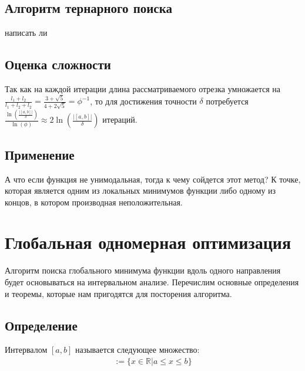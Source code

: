 \documentclass{article}
\begin{document}
    \subsection{Алгоритм тернарного поиска}
    написать ли

    \subsection{Оценка сложности}
    Так как на каждой итерации длина рассматриваемого отрезка умножается на $\frac{l_1+l_2}{l_1+l_2+l_2}=\frac{3+\sqrt{5}}{4+2\sqrt{5}}=\phi^{-1}$, то для достижения точности $\delta$ потребуется $\frac{\ln(\frac{|[a, b]|}{\delta})}{\ln(\phi)} \approx 2\ln(\frac{|[a, b]|}{\delta})$ итераций.

    \subsection{Применение}
    А что если функция не унимодальная, тогда к чему сойдется этот метод? К точке, которая является одним из локальных минимумов функции либо одному из концов, в котором производная неположительная.\\

    \newpage


    \section{Глобальная одномерная оптимизация}
    Алгоритм поиска глобального минимума функции вдоль одного направления будет основываться на интервальном анализе. Перечислим основные определения и теоремы, которые нам пригодятся для посторения алгоритма.

    \subsection{Определение}
    Интервалом $[a, b]$ называется следующее множество:
    \begin{gather*}
    [a,b]
        :=\{x \in \mathbb{R} | a \le x \le b\}
    \end{gather*}
\end{document}
